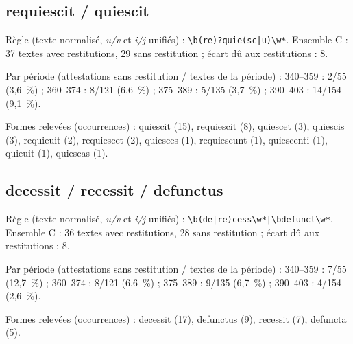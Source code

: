 \subsection*{requiescit / quiescit}
\noindent Règle (texte normalisé, \textit{u/v} et \textit{i/j} unifiés) : \texttt{\small \textbackslash{}b(\allowbreak{}re)?quie(\allowbreak{}sc|\allowbreak{}u)\textbackslash{}w*}. Ensemble C : 37 textes avec restitutions, 29 sans restitution ; écart dû aux restitutions : 8.\par
\noindent Par période (attestations sans restitution / textes de la période) : 340–359 : 2/55 (3,6~\%) ; 360–374 : 8/121 (6,6~\%) ; 375–389 : 5/135 (3,7~\%) ; 390–403 : 14/154 (9,1~\%).\par
\noindent Formes relevées (occurrences) : quiescit (15), requiescit (8), quiescet (3), quiescis (3), requieuit (2), requiescet (2), quiesces (1), requiescunt (1), quiescenti (1), quieuit (1), quiescas (1).\par
{}\par\medskip
\subsection*{decessit / recessit / defunctus}
\noindent Règle (texte normalisé, \textit{u/v} et \textit{i/j} unifiés) : \texttt{\small \textbackslash{}b(\allowbreak{}de|\allowbreak{}re)cess\textbackslash{}w*|\allowbreak{}\textbackslash{}bdefunct\textbackslash{}w*}. Ensemble C : 36 textes avec restitutions, 28 sans restitution ; écart dû aux restitutions : 8.\par
\noindent Par période (attestations sans restitution / textes de la période) : 340–359 : 7/55 (12,7~\%) ; 360–374 : 8/121 (6,6~\%) ; 375–389 : 9/135 (6,7~\%) ; 390–403 : 4/154 (2,6~\%).\par
\noindent Formes relevées (occurrences) : decessit (17), defunctus (9), recessit (7), defuncta (5).\par
{}\par\medskip
